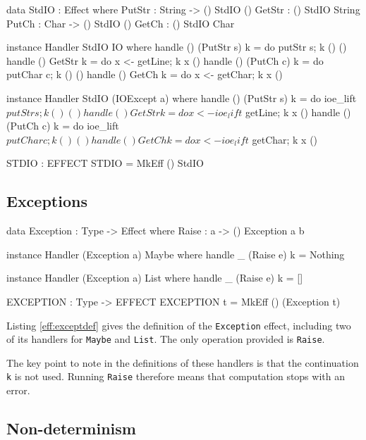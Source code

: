 \begin{code}[float=h,frame=single, caption={Console I/O Effect Definition}, label=eff:stdiodef]
data StdIO : Effect where
     PutStr : String -> { () } StdIO () 
     GetStr : { () } StdIO String 
     PutCh : Char -> { () } StdIO ()
     GetCh : { () } StdIO Char

instance Handler StdIO IO where
    handle () (PutStr s) k = do putStr s; k () ()
    handle () GetStr     k = do x <- getLine; k x ()
    handle () (PutCh c)  k = do putChar c; k () () 
    handle () GetCh      k = do x <- getChar; k x ()

instance Handler StdIO (IOExcept a) where
    handle () (PutStr s) k = do ioe_lift $ putStr s; k () ()
    handle () GetStr     k = do x <- ioe_lift $ getLine; k x ()
    handle () (PutCh c)  k = do ioe_lift $ putChar c; k () () 
    handle () GetCh      k = do x <- ioe_lift $ getChar; k x ()

STDIO : EFFECT
STDIO = MkEff () StdIO
\end{code}

\subsection{Exceptions}

\begin{code}[float=h,frame=single, caption={Exception Effect Definition}, label=eff:exceptdef]
data Exception : Type -> Effect where 
     Raise : a -> { () } Exception a b

instance Handler (Exception a) Maybe where
     handle _ (Raise e) k = Nothing

instance Handler (Exception a) List where
     handle _ (Raise e) k = []

EXCEPTION : Type -> EFFECT
EXCEPTION t = MkEff () (Exception t)
\end{code}

Listing \ref{eff:exceptdef} gives the definition of the \texttt{Exception}
effect, including two of its handlers for \texttt{Maybe} and \texttt{List}.
The only operation provided is \texttt{Raise}. 

The key point to note in the definitions of these handlers is that the
continuation \texttt{k} is not used. Running \texttt{Raise} therefore means
that computation stops with an error.

\subsection{Non-determinism}

